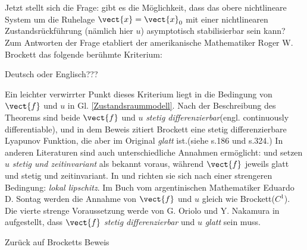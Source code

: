 Jetzt stellt sich die Frage: gibt es die Möglichkeit, dass das obere nichtlineare System um die Ruhelage $\vect{x}=\vect{x}_{0}$ mit einer nichtlinearen Zustandsrückführung (nämlich hier $u$) asymptotisch stabilisierbar sein kann? Zum Antworten der Frage etabliert der amerikanische Mathematiker Roger W. Brockett das folgende berühmte Kriterium\cite{brockett1983asymptotic}:
\begin{theorem}
Deutsch oder Englisch???
\end{theorem}
Ein leichter verwirrter Punkt dieses Kriterium liegt in die Bedingung von $\vect{f}$ und $u$ in Gl. \ref{Zustandsraummodell}. Nach der Beschreibung des Theorems sind beide $\vect{f}$ und $u$ \emph{stetig differenzierbar}(engl. continuously differentiable), und in dem Beweis zitiert Brockett eine stetig differenzierbare Lyapunov Funktion, die aber im Original \emph{glatt} ist.(siehe \cite{brockett1983asymptotic} s.186 und \cite{wilson1967structure} s.324.) In anderen Literaturen sind auch unterschiedliche Annahmen ermöglicht: \cite{coron2007control} und \cite{orsi2003necessary} setzen $u$ \emph{stetig und zeitinvariant} als bekannt voraus, während $\vect{f}$ jeweils glatt und stetig und zeitinvariant. In \cite{stern2002brockett} und \cite{colonius2012nichtlineare} richten sie sich nach einer strengeren Bedingung: \emph{lokal lipschitz}. Im Buch vom argentinischen Mathematiker Eduardo D. Sontag \cite{sontag2013mathematical} werden die Annahme von $\vect{f}$ und $u$ gleich wie Brockett($C^{1}$). Die vierte strenge Voraussetzung werde von G. Oriolo und Y. Nakamura in \cite{oriolo1991control} aufgestellt, dass $\vect{f}$ \emph{stetig differenzierbar} und $u$ \emph{glatt} sein muss.

Zurück auf Brocketts Beweis 
